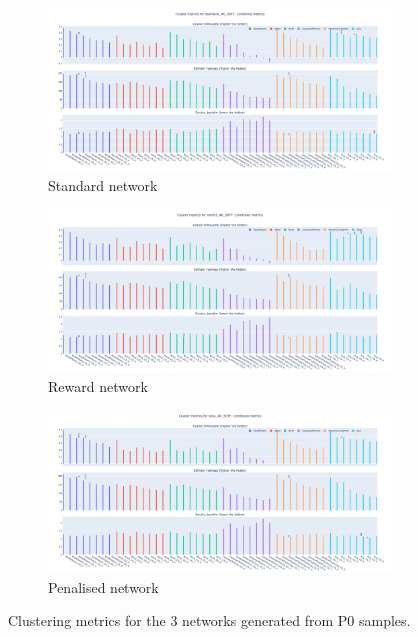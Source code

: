 \begin{figure}[!htb]
    \hfill
    \begin{subfigure}{1.0\linewidth}
        \includegraphics[width=1.0\textwidth,height=0.25\textheight]{Sections/Network_I/Resources/P0/CA_metrics_Std_2_tum_4k.png}
        \caption{Standard network}
    \end{subfigure} %
    \hfill
    \begin{subfigure}{0.49\linewidth}
        \includegraphics[width=1.0\textwidth,height=0.25\textheight]{Sections/Network_I/Resources/P0/CA_metrics_Rwd_2_tum_4k.png}
        \caption{Reward network}
    \end{subfigure}
    \hfill
    \begin{subfigure}{0.49\linewidth}
        \includegraphics[width=1.0\textwidth,height=0.25\textheight]{Sections/Network_I/Resources/P0/CA_metrics_Pen_2_tum_4k.png}
        \caption{Penalised network}
    \end{subfigure}
    \hfill
    \caption{Clustering metrics for the 3 networks generated from P0 samples.}
    \label{fig:N_I:p0_choosing_cs}
\end{figure}



